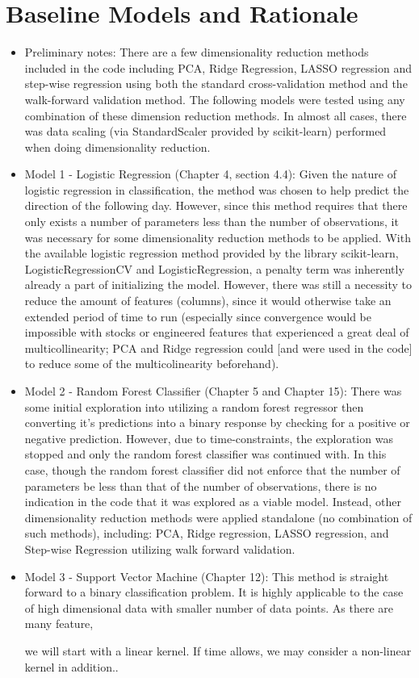 \documentclass[11pt]{article}
\begin{document}
\section{Baseline Models and Rationale}
\begin{itemize}
    \item Preliminary notes: There are a few dimensionality reduction methods included in the code including PCA, Ridge Regression, LASSO regression and step-wise regression using both the standard cross-validation method and the walk-forward validation method. The following models were tested using any combination of these dimension reduction methods. In almost all cases, there was data scaling (via StandardScaler provided by scikit-learn) performed when doing dimensionality reduction.
    \item Model 1 - Logistic Regression (Chapter 4, section 4.4): 
    Given the nature of logistic regression in classification, the method was chosen to help predict the direction of the following day. However, since this method requires that there only exists a number of parameters less than the number of observations, it was necessary for some dimensionality reduction methods to be applied. With the available logistic regression method provided by the library scikit-learn, LogisticRegressionCV and LogisticRegression, a penalty term was inherently already a part of initializing the model. However, there was still a necessity to reduce the amount of features (columns), since it would otherwise take an extended period of time to run (especially since convergence would be impossible with stocks or engineered features that experienced a great deal of multicollinearity; PCA and Ridge regression could [and were used in the code] to reduce some of the multicolinearity beforehand).
    \item Model 2 - Random Forest Classifier (Chapter 5 and Chapter 15): 
    There was some initial exploration into utilizing a random forest regressor then converting it's predictions into a binary response by checking for a positive or negative prediction. However, due to time-constraints, the exploration was stopped and only the random forest classifier was continued with. In this case, though the random forest classifier did not enforce that the number of parameters be less than that of the number of observations, there is no indication in the code that it was explored as a viable model. Instead, other dimensionality reduction methods were applied standalone (no combination of such methods), including: PCA, Ridge regression, LASSO regression, and Step-wise Regression utilizing walk forward validation.
    \item Model 3 - Support Vector Machine (Chapter 12): This method is straight forward to a binary classification problem. It is highly applicable to the case of high dimensional data with smaller number of data points. As there are many feature, 
    
    
    
    
    we will start with a linear kernel. If time allows, we may consider a non-linear kernel in addition..

\end{itemize}
\end{document}
